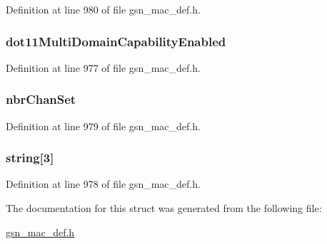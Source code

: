 Definition at line 980 of file gsn\_\-mac\_\-def.h.

\hypertarget{a00115_a0080f72238617c44abf6caf1da8afbb9}{
\subsubsection[{dot11MultiDomainCapabilityEnabled}]{ {\bf dot11MultiDomainCapabilityEnabled}}}
\label{a00115_a0080f72238617c44abf6caf1da8afbb9}


Definition at line 977 of file gsn\_\-mac\_\-def.h.

\hypertarget{a00115_a4cf3b775df0be874a70aa4a8e6b529a7}{
\subsubsection[{nbrChanSet}]{ {\bf nbrChanSet}}}
\label{a00115_a4cf3b775df0be874a70aa4a8e6b529a7}


Definition at line 979 of file gsn\_\-mac\_\-def.h.

\hypertarget{a00115_a1efe6cde196e8248cee98f71f7562141}{
\subsubsection[{string}]{ {\bf string}\mbox{[}3\mbox{]}}}
\label{a00115_a1efe6cde196e8248cee98f71f7562141}


Definition at line 978 of file gsn\_\-mac\_\-def.h.



The documentation for this struct was generated from the following file:\begin{DoxyCompactItemize}
\item 
\hyperlink{a00522}{gsn\_\-mac\_\-def.h}\end{DoxyCompactItemize}
